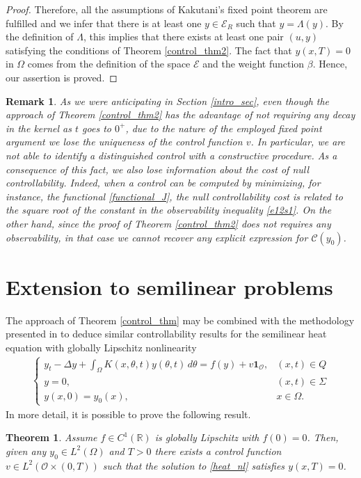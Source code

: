 \documentclass[preprint,1p]{elsarticle}
\newcommand{\D}{\displaystyle}
\newcommand{\R}{\mathbb{R}}
\newtheorem{theorem}{\bf Theorem}[section]
\newtheorem{remark}{\bf Remark}[section]
\begin{document}
\begin{proof}
Therefore, all the assumptions of Kakutani's fixed point theorem are fulfilled and we infer that there is at least one $y\in \mathcal E_R$ such that $y=\Lambda(y)$. By the definition of $\Lambda$, this implies that there exists at least one pair $(u,y)$ satisfying the
conditions of Theorem \ref{control_thm2}. The fact that $y(x,T) = 0$ in $\Omega$ comes from the definition of the space $\mathcal E$ and the weight function $\beta$. Hence, our assertion is proved.	
\end{proof}
%
\begin{remark}
As we were anticipating in Section \ref{intro_sec}, even though the approach of Theorem \ref{control_thm2} has the advantage of not requiring any decay in the kernel as $t$ goes to $0^+$, due to the nature of the employed fixed point argument we lose the uniqueness of the control function $v$. In particular, we are not able to identify a distinguished control with a constructive procedure. As a consequence of this fact, we also lose information about the cost of null controllability. Indeed, when a control can be computed by minimizing, for instance, the functional \eqref{functional_J}, the null controllability cost is related to the square root of the constant in the observability inequality \eqref{e12s1}. On the other hand, since the proof of Theorem \ref{control_thm2} does not requires any observability, in that case we cannot recover any explicit expression for $\mathcal C(y_0)$.
\end{remark}

\section{Extension to semilinear problems}\label{nl_sec}

The approach of Theorem \ref{control_thm} may be combined with the methodology presented in \cite{fabre1995approximate,fernandez1999approximate,fernandez1997null,zuazua1991exact} to deduce similar controllability results for the semilinear heat equation with globally Lipschitz nonlinearity  
\begin{align}\label{heat_nl}
\begin{cases}
\D y_t - \Delta y + \int_\Omega K(x,\theta,t)y(\theta,t)\,d\theta = f(y) + v\mathbf{1}_{\mathcal O}, & (x,t)\in Q
\\
y = 0, & (x,t)\in\Sigma
\\
y(x,0) = y_0(x), & x\in\Omega.
\end{cases}
\end{align}
In more detail, it is possible to prove the following result.
\begin{theorem}\label{control_thm_nl}
Assume $f\in C^1(\R)$ is globally Lipschitz with $f(0)=0$. Then, given any $y_0\in L^2(\Omega)$ and $T>0$ there exists a control function $v\in L^2(\mathcal O\times(0,T))$ such that the solution to \eqref{heat_nl} satisfies $y(x,T)=0$.
\end{theorem}
\end{document}
